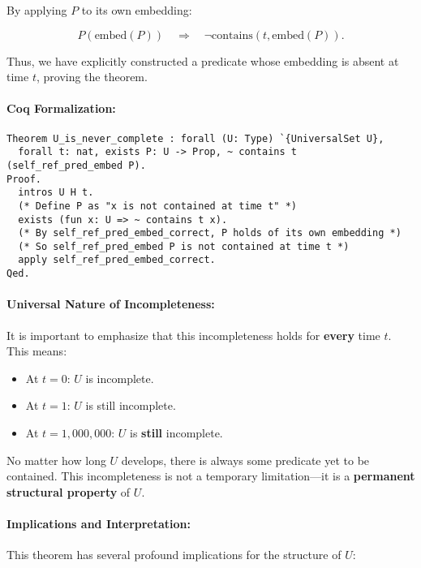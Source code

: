 \documentclass[12pt]{article}
\begin{document}
By applying \( P \) to its own embedding:

\begin{equation}
    P(\text{embed}(P)) \quad \Rightarrow \quad \neg \text{contains}(t, \text{embed}(P)).
\end{equation}

Thus, we have explicitly constructed a predicate whose embedding is absent at time \( t \), proving the theorem.

\paragraph{Coq Formalization:}
\begin{lstlisting}[language=Coq]
Theorem U_is_never_complete : forall (U: Type) `{UniversalSet U},
  forall t: nat, exists P: U -> Prop, ~ contains t (self_ref_pred_embed P).
Proof.
  intros U H t.
  (* Define P as "x is not contained at time t" *)
  exists (fun x: U => ~ contains t x).
  (* By self_ref_pred_embed_correct, P holds of its own embedding *)
  (* So self_ref_pred_embed P is not contained at time t *)
  apply self_ref_pred_embed_correct.
Qed.
\end{lstlisting}

\paragraph{Universal Nature of Incompleteness:}
It is important to emphasize that this incompleteness holds for \textbf{every} time \( t \). This means:

\begin{itemize}
    \item At \( t=0 \): \( U \) is incomplete.
    \item At \( t=1 \): \( U \) is still incomplete.
    \item At \( t=1{,}000{,}000 \): \( U \) is \textbf{still} incomplete.
\end{itemize}

No matter how long \( U \) develops, there is always some predicate yet to be contained. This incompleteness is not a temporary limitation—it is a \textbf{permanent structural property} of \( U \).

\paragraph{Implications and Interpretation:}
This theorem has several profound implications for the structure of \( U \):
\end{document}
